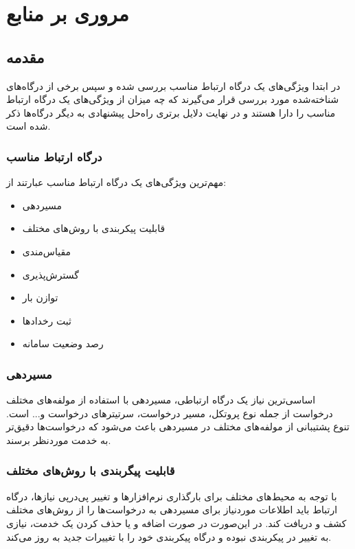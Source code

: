 \section{مروری بر منابع}\label{sec:sources}

\subsection{مقدمه}\label{subsec:sources_subject}
در ابتدا ویژگی‌های یک درگاه ارتباط مناسب بررسی شده و سپس برخی از درگاه‌های شناخته‌شده‌ مورد بررسی قرار می‌گیرند که چه میزان از ویژگی‌های یک درگاه ارتباط مناسب را دارا هستند و در نهایت دلایل برتری راه‌حل پیشنهادی به دیگر درگاه‌ها ذکر شده است.


\subsubsection{درگاه ارتباط مناسب}\label{subsec:sources_gateway}
مهم‌ترین ویژگی‌های یک درگاه ارتباط مناسب عبارتند از:

\begin{itemize}
    \item مسیردهی 
    \item قابلیت پیکربندی با روش‌های مختلف
    \item مقیاس‌مندی 
    \item گسترش‌پذیری 
    \item توازن بار 
    \item ثبت رخداد‌ها 
    \item رصد وضعیت سامانه 
\end{itemize}

\subsubsection{مسیر‌دهی}
اساسی‌ترین نیاز یک درگاه ارتباطی، مسیر‌دهی با استفاده از مولفه‌های مختلف درخواست از جمله نوع پروتکل، مسیر درخواست، سرتیتر‌های درخواست و... است. تنوع پشتیبانی از مولفه‌های مختلف در مسیر‌دهی باعث می‌شود که درخواست‌ها دقیق‌تر به خدمت مورد‌نظر برسند.

\subsubsection{قابلیت پیگربندی با روش‌‌های مختلف}
با توجه به محیط‌های مختلف برای بارگذاری نرم‌افزارها و تغییر پی‌در‌پی نیازها، درگاه ارتباط باید اطلاعات مورد‌نیاز برای مسیر‌دهی به درخواست‌ها را از روش‌های مختلف کشف و دریافت کند. در این‌صورت در صورت اضافه و یا حذف کردن یک خدمت، نیازی به تغییر در پیکربندی نبوده و درگاه پیکربندی خود را با تغییرات جدید به روز می‌کند.

